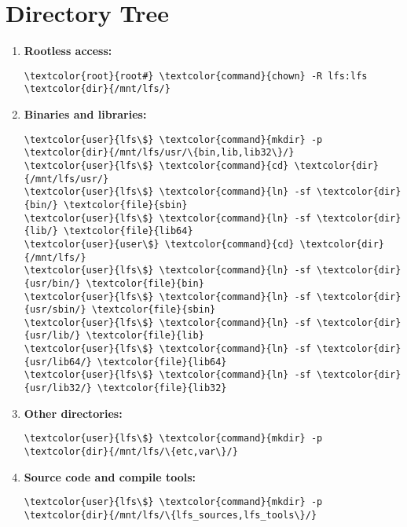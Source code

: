 \documentclass[10pt, a4paper, onecolumn, oneside, titlepage, openany]{book}
\begin{document}
\section{Directory Tree}
\begin{enumerate}
    \item \textbf{Rootless access:}
\begin{Verbatim}[commandchars=\\\{\}]
\textcolor{root}{root#} \textcolor{command}{chown} -R lfs:lfs \textcolor{dir}{/mnt/lfs/}
\end{Verbatim}
    \item \textbf{Binaries and libraries:}
\begin{Verbatim}[commandchars=\\\{\}]
\textcolor{user}{lfs\$} \textcolor{command}{mkdir} -p \textcolor{dir}{/mnt/lfs/usr/\{bin,lib,lib32\}/}
\textcolor{user}{lfs\$} \textcolor{command}{cd} \textcolor{dir}{/mnt/lfs/usr/}
\textcolor{user}{lfs\$} \textcolor{command}{ln} -sf \textcolor{dir}{bin/} \textcolor{file}{sbin}
\textcolor{user}{lfs\$} \textcolor{command}{ln} -sf \textcolor{dir}{lib/} \textcolor{file}{lib64}
\textcolor{user}{user\$} \textcolor{command}{cd} \textcolor{dir}{/mnt/lfs/}
\textcolor{user}{lfs\$} \textcolor{command}{ln} -sf \textcolor{dir}{usr/bin/} \textcolor{file}{bin}
\textcolor{user}{lfs\$} \textcolor{command}{ln} -sf \textcolor{dir}{usr/sbin/} \textcolor{file}{sbin}
\textcolor{user}{lfs\$} \textcolor{command}{ln} -sf \textcolor{dir}{usr/lib/} \textcolor{file}{lib}
\textcolor{user}{lfs\$} \textcolor{command}{ln} -sf \textcolor{dir}{usr/lib64/} \textcolor{file}{lib64}
\textcolor{user}{lfs\$} \textcolor{command}{ln} -sf \textcolor{dir}{usr/lib32/} \textcolor{file}{lib32}
\end{Verbatim}
    \item \textbf{Other directories:}
\begin{Verbatim}[commandchars=\\\{\}]
\textcolor{user}{lfs\$} \textcolor{command}{mkdir} -p \textcolor{dir}{/mnt/lfs/\{etc,var\}/}
\end{Verbatim}
    \item \textbf{Source code and compile tools:}
\begin{Verbatim}[commandchars=\\\{\}]
\textcolor{user}{lfs\$} \textcolor{command}{mkdir} -p \textcolor{dir}{/mnt/lfs/\{lfs_sources,lfs_tools\}/}
\end{Verbatim}
\end{enumerate}
\end{document}

